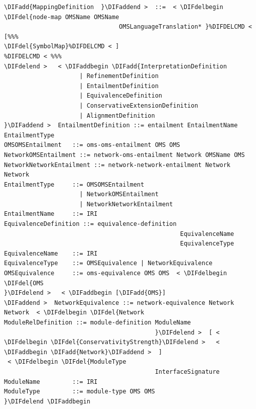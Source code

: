 \documentclass[10pt,fleqn,final]{scrreprt}
\newenvironment{definitions}[0]{\medskip }{}
\providecommand{\DIFadd}[1]{{\protect\color{blue}\uwave{#1}}} %
\providecommand{\DIFdel}[1]{{\protect\color{red}\sout{#1}}}                      %
\providecommand{\DIFaddbegin}{} %
\providecommand{\DIFaddend}{} %
\providecommand{\DIFdelbegin}{} %
\providecommand{\DIFdelend}{} %
\begin{document}
\begin{definitions}
\begin{lstlisting}[language=ebnf,escapeinside={<>},mathescape]  %DIF >  abstract syntax
\DIFadd{MappingDefinition  }\DIFaddend >  ::=  < \DIFdelbegin \DIFdel{node-map OMSName OMSName
                                OMSLanguageTranslation* }%DIFDELCMD < [%%%
\DIFdel{SymbolMap}%DIFDELCMD < ]
%DIFDELCMD < %%%
\DIFdelend >   < \DIFaddbegin \DIFadd{InterpretationDefinition
                     | RefinementDefinition
                     | EntailmentDefinition
                     | EquivalenceDefinition
                     | ConservativeExtensionDefinition
                     | AlignmentDefinition
}\DIFaddend >  EntailmentDefinition ::= entailment EntailmentName EntailmentType
OMSOMSEntailment   ::= oms-oms-entailment OMS OMS
NetworkOMSEntailment ::= network-oms-entailment Network OMSName OMS
NetworkNetworkEntailment ::= network-network-entailment Network Network
EntailmentType     ::= OMSOMSEntailment
                     | NetworkOMSEntailment
                     | NetworkNetworkEntailment
EntailmentName     ::= IRI
EquivalenceDefinition ::= equivalence-definition
                                                 EquivalenceName
                                                 EquivalenceType
EquivalenceName    ::= IRI
EquivalenceType    ::= OMSEquivalence | NetworkEquivalence
OMSEquivalence     ::= oms-equivalence OMS OMS  < \DIFdelbegin \DIFdel{OMS
}\DIFdelend >   < \DIFaddbegin [\DIFadd{OMS}]
\DIFaddend >  NetworkEquivalence ::= network-equivalence Network Network  < \DIFdelbegin \DIFdel{Network
ModuleRelDefinition ::= module-definition ModuleName
                                          }\DIFdelend >  [ < \DIFdelbegin \DIFdel{ConservativityStrength}\DIFdelend >   < \DIFaddbegin \DIFadd{Network}\DIFaddend >  ]
 < \DIFdelbegin \DIFdel{ModuleType
                                          InterfaceSignature
ModuleName         ::= IRI
ModuleType         ::= module-type OMS OMS
}\DIFdelend \DIFaddbegin \end{lstlisting}


\end{definitions}
\end{document}

